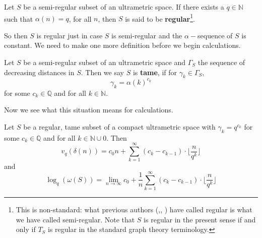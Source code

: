 \begin{definition}
Let $S$ be a semi-regular subset of an ultrametric space. If there exists a $q \in \mathbb{N}$ such that $\alpha(n) = q$, for all $n$, then $S$ is said to be \textbf{regular}\footnote{This is non-standard: what previous authors (\cite{amice},\cite{cef}, \cite{fp}) have called regular is what we have called semi-regular. Note that $S$ is regular in the present sense if and only if $T_S$ is regular in the standard graph theory terminology.}. %
\end{definition}


So then $S$ is regular just in case $S$ is semi-regular and the $\alpha-$sequence of $S$ is constant. We need to make one more definition before we begin calculations. \\

\begin{definition}
Let $S$ be a semi-regular subset of an ultrametric space and $\Gamma_S$ the sequence of decreasing distances in $S$. Then we say $S$ is \textbf{tame}, if for $\gamma_k \in \Gamma_S$, \[\gamma_k = \alpha(k)^{c_k}\] for some $c_k \in \mathbb{Q}$ and for all $k \in \mathbb{N}$.
\end{definition}

Now we see what this situation means for calculations.\\

\begin{proposition}
	Let $S$ be a regular, tame subset of a compact ultrametric space with $\gamma_k = q^{c_k}$ for some $c_k \in \mathbb{Q}$ and for all $k \in \mathbb{N} \cup 0$. Then 
	\[v_{q}(\delta(n)) =  c_0n + \sum_{k=1}^{\infty} (c_{k} - c_{k-1}) \cdot \lfloor\frac{n}{q^{k}}\rfloor \]
	 and 
	\[\log_q(\omega(S)) = \lim_{n\to\infty} c_0 + \frac{1}{n}\sum_{k=1}^{\infty} (c_{k} - c_{k-1}) \cdot \lfloor\frac{n}{q^{k}}\rfloor  \]
\end{proposition}


